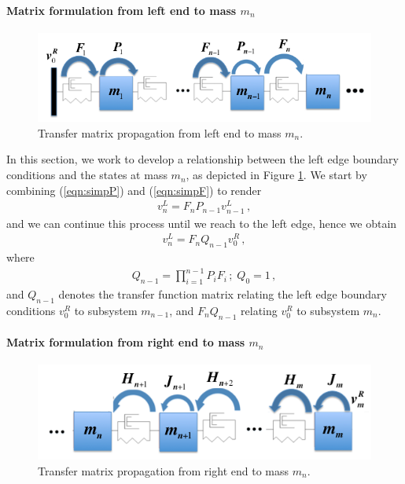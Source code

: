 \documentclass[11pt]{ucthesis}
\begin{document}
\paragraph{Matrix formulation from left end to mass $m_n$}
\label{sec:Right}

\begin{figure}
\centering
\includegraphics[width=1\linewidth]{Figures/left_to_n.png}
\caption{Transfer matrix propagation from left end to mass $m_n$.}
\label{left_2_n}
\end{figure}

In this section, we work to develop a relationship between the left edge boundary conditions and the states at mass $m_n$, as depicted in Figure \ref{left_2_n}. We start by combining  (\ref{eqn:simpP}) and (\ref{eqn:simpF}) to render
\begin{eqnarray}
v_{n}^L = F_{n} P_{n-1} v_{n-1}^L \,,
\label{eqn:propRight}
\end{eqnarray}
and we can continue this process until we reach to the left edge, hence we obtain
\begin{eqnarray}
v_n^L = F_n Q_{n-1} v_0^R \,,
\label{eqn:propQ}
\end{eqnarray}
where
\begin{eqnarray}
Q_{n-1}= \prod_{i=1}^{n-1}P_{i}F_{i} \,;\; Q_{0} = 1\,,
\end{eqnarray}
and $Q_{n-1}$ denotes the transfer function matrix relating the left edge boundary conditions $v_0^R$ to subsystem $m_{n-1}$, and $F_n Q_{n-1}$ relating $v_0^R$ to subsystem $m_n$.

\paragraph{Matrix formulation from right end to mass $m_n$}
\label{sec:Left}

\begin{figure}
\centering
\includegraphics[width=1\linewidth]{Figures/right_to_n.png}
\caption{Transfer matrix propagation from right end to mass $m_n$.}
\label{right_2_n}
\end{figure}
\end{document}
